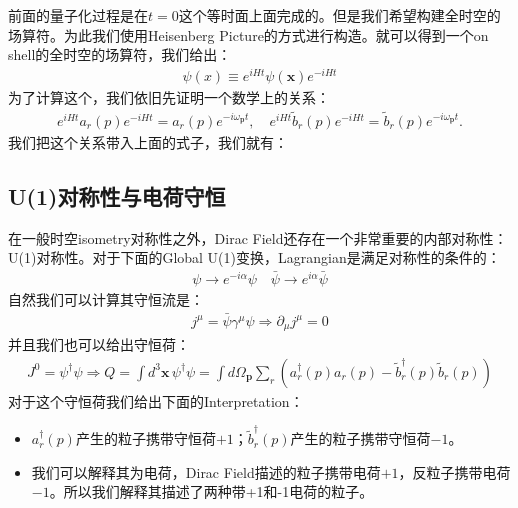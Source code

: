 前面的量子化过程是在$ t = 0 $这个等时面上面完成的。但是我们希望构建全时空的场算符。为此我们使用Heisenberg
Picture的方式进行构造。就可以得到一个on shell的全时空的场算符，我们给出：
\begin{align}
  \psi(x)\equiv e^{iHt}\psi(\mathbf{x})e^{-iHt}
\end{align}
为了计算这个，我们依旧先证明一个数学上的关系：
\begin{align}
  e^{iHt}a_r(p)e^{-iHt}=a_r(p)e^{-i\omega_\mathbf{p}t},\quad
  e^{iHt}\tilde{b}_r(p)e^{-iHt}=\tilde{b}_r(p)e^{-i\omega_\mathbf{p}t}.
\end{align}
我们把这个关系带入上面的式子，我们就有：

\subsection{U(1)对称性与电荷守恒}

在一般时空isometry对称性之外，Dirac Field还存在一个非常重要的内部对称性：U(1)对称性。对于下面的Global
U(1)变换，Lagrangian是满足对称性的条件的：
\begin{align}
  \psi\to e^{-i\alpha}\psi\quad\bar{\psi}\to e^{i\alpha}\bar{\psi}
\end{align}
自然我们可以计算其守恒流是：
\begin{align}
  j^\mu = \bar{\psi}\gamma^\mu\psi \Rightarrow \partial_\mu j^\mu = 0
\end{align}
并且我们也可以给出守恒荷：
\begin{align}
  J^0 = \psi^\dagger\psi \Rightarrow Q = \int
  d^3\mathbf{x}\,\psi^\dagger\psi = \int
  d\Omega_\mathbf{p}\sum_r\left(a_r^\dagger(p)a_r(p)-\tilde{b}_r^\dagger(p)\tilde{b}_r(p)\right)
\end{align}
对于这个守恒荷我们给出下面的Interpretation：
\begin{itemize}
  \item $ a_r^\dagger(p) $产生的粒子携带守恒荷$ +1 $；$ \tilde{b}_r^\dagger(p)
    $产生的粒子携带守恒荷$ -1 $。
  \item 我们可以解释其为电荷，Dirac Field描述的粒子携带电荷$ +1 $，反粒子携带电荷$ -1
    $。所以我们解释其描述了两种带+1和-1电荷的粒子。
\end{itemize}

